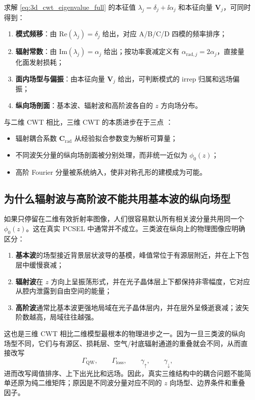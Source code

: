 求解 \cref{eq:3d_cwt_eigenvalue_full} 的本征值 $\lambda_j=\delta_j+\ii\alpha_j$ 和本征向量 $\bm{V}_j$，可同时得到：
\begin{enumerate}
  \item \textbf{模式频移}：由 $\mathrm{Re}(\lambda_j)=\delta_j$ 给出，对应 A/B/C/D 四模的频率排序；
  \item \textbf{辐射常数}：由 $\mathrm{Im}(\lambda_j)=\alpha_j$ 给出；按功率衰减定义有 $\alpha_{\mathrm{rad},j}=2\alpha_j$，直接量化面发射损耗；
  \item \textbf{面内场型与偏振}：由本征向量 $\bm{V}_j$ 给出，可判断模式的 irrep 归属和远场偏振；
  \item \textbf{纵向场剖面}：基本波、辐射波和高阶波各自的 $z$ 方向场分布。
\end{enumerate}

与二维 CWT 相比，三维 CWT 的本质进步在于三点 \cite{liang2012square}：
\begin{itemize}
  \item 辐射耦合系数 $\bm{C}_{\mathrm{rad}}$ 从经验拟合参数变为解析可算量；
  \item 不同波矢分量的纵向场剖面被分别处理，而非统一近似为 $\phi_0(z)$；
  \item 高阶 Fourier 分量被系统纳入，使非对称孔形的建模成为可能。
\end{itemize}

\subsection{为什么辐射波与高阶波不能共用基本波的纵向场型}
如果只停留在二维有效折射率图像，人们很容易默认所有相关波分量共用同一个 $\phi_0(z)$。这在真实 PCSEL 中通常并不成立。三类波在纵向上的物理图像应明确区分：
\begin{enumerate}
  \item \textbf{基本波}的场型接近背景层状波导的基模，峰值常位于有源层附近，并在上下包层中缓慢衰减；
  \item \textbf{辐射波}在 $z$ 方向上呈振荡形式，并在光子晶体层上下都保持非零幅度，它对应从腔内泄露到自由空间的能量；
  \item \textbf{高阶波}通常比基本波更强地局域在光子晶体层内，并在层外呈倏逝衰减；波矢阶数越高，局域往往越强。
\end{enumerate}

这也是三维 CWT 相比二维模型最根本的物理进步之一。因为一旦三类波的纵向场型不同，它们与有源区、损耗层、空气/衬底辐射通道的重叠就会不同，从而直接改写
\begin{equation}
  \Gamma_{\mathrm{QW}},\qquad
  \Gamma_{\mathrm{loss}},\qquad
  \gamma_{\uparrow},\qquad
  \gamma_{\downarrow},
\end{equation}
进而改写阈值排序、上下出光比和远场。因此，真实三维结构中的耦合问题不能简单还原为纯二维矩阵；原因是不同波分量对应不同的 $z$ 向场型、边界条件和重叠因子。

